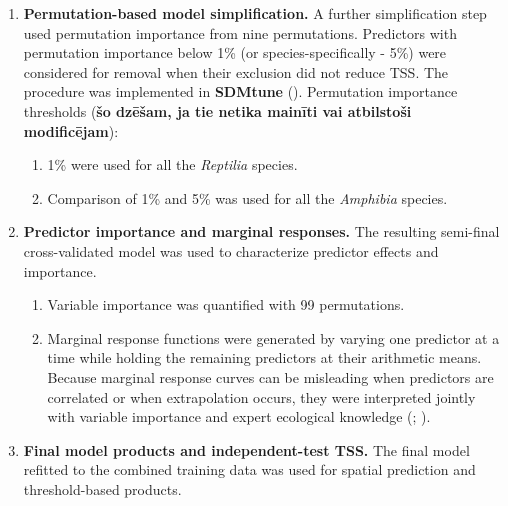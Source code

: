 \documentclass[
  openany]{book}
\begin{document}
\begin{enumerate}
  \begin{enumerate}
  \def\labelenumii{\alph{enumii}.}
  \item
    with all background locations from step 3; and
  \item
    with 10,000 randomly selected background locations, to reduce the risk that variable-removal decisions were driven by the very large background sample.
  \end{enumerate}
\item
  \textbf{Permutation-based model simplification.} A further simplification step used permutation importance from nine permutations. Predictors with permutation importance below 1\% (or species-specifically - 5\%) were considered for removal when their exclusion did not reduce TSS. The procedure was implemented in \textbf{SDMtune} (). Permutation importance thresholds (\textbf{šo dzēšam, ja tie netika mainīti vai atbilstoši modificējam}):

  \begin{enumerate}
  \def\labelenumii{\alph{enumii}.}
  \item
    1\% were used for all the \emph{Reptilia} species.
  \item
    Comparison of 1\% and 5\% was used for all the \emph{Amphibia} species.
  \end{enumerate}
\item
  \textbf{Predictor importance and marginal responses.} The resulting semi-final cross-validated model was used to characterize predictor effects and importance.

  \begin{enumerate}
  \def\labelenumii{\alph{enumii}.}
  \item
    Variable importance was quantified with 99 permutations.
  \item
    Marginal response functions were generated by varying one predictor at a time while holding the remaining predictors at their arithmetic means. Because marginal response curves can be misleading when predictors are correlated or when extrapolation occurs, they were interpreted jointly with variable importance and expert ecological knowledge (; ).
  \end{enumerate}
\item
  \textbf{Final model products and independent-test TSS.} The final model refitted to the combined training data was used for spatial prediction and threshold-based products.


\end{enumerate}
\end{document}
